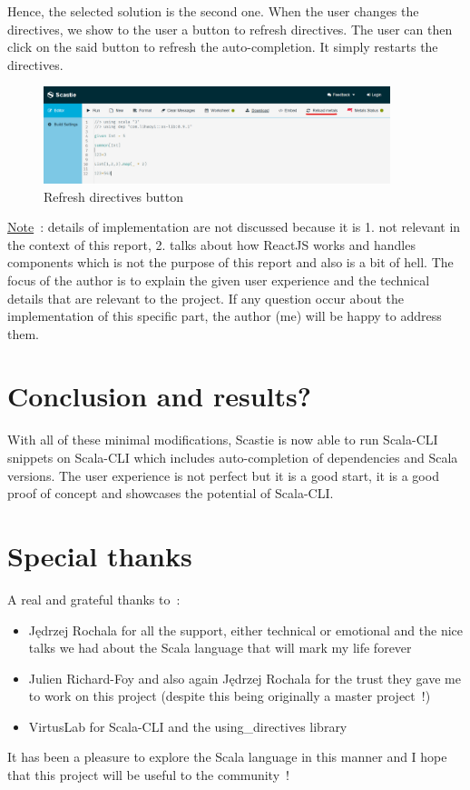 \documentclass{article}
\begin{document}
Hence, the selected solution is the second one. When the user changes the directives, we show to the user a button to refresh directives. The user can then click on the said button to refresh the auto-completion. It simply restarts the directives.

\begin{figure}[H]
    \centering
    \includegraphics[width=0.9\textwidth]{scastie_reloadmetals.png}
    \caption{Refresh directives button}
\end{figure}

\underline{Note}~: details of implementation are not discussed because it is 1. not relevant in the context of this report, 2. talks about how ReactJS works and handles components which is not the purpose of this report and also is a bit of hell. The focus of the author is to explain the given user experience and the technical details that are relevant to the project. If any question occur about the implementation of this specific part, the author (me) will be happy to address them.

\section{Conclusion and results?}

With all of these minimal modifications, Scastie is now able to run Scala-CLI snippets on Scala-CLI which includes auto-completion of dependencies and Scala versions. The user experience is not perfect but it is a good start, it is a good proof of concept and showcases the potential of Scala-CLI.

{\color{red}{TODO: Add some benchmarks}}

\section{Special thanks}

A real and grateful thanks to~:

\begin{itemize}
    \item Jędrzej Rochala for all the support, either technical or emotional and the nice talks we had about the Scala language that will mark my life forever
    \item Julien Richard-Foy and also again Jędrzej Rochala for the trust they gave me to work on this project (despite this being originally a master project~!)
    \item VirtusLab for Scala-CLI and the using\_directives library
\end{itemize}

It has been a pleasure to explore the Scala language in this manner and I hope that this project will be useful to the community~!
\end{document}
